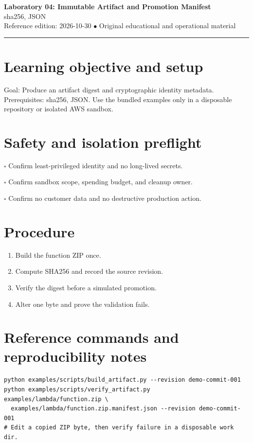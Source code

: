 \documentclass[10pt,letterpaper]{article}
\begin{document}
\begin{center}
{\LARGE\bfseries\color{cdblue}Laboratory 04: Immutable Artifact and Promotion Manifest}\\[7pt]
{\large sha256, JSON}\\[6pt]
{\small Reference edition: 2026-10-30 $\bullet$ Original educational and operational material}
\end{center}
\noindent\color{cdblue}\rule{\linewidth}{1.2pt}\color{black}
\vspace{0.4em}
\section{Learning objective and setup}
Goal: Produce an artifact digest and cryptographic identity metadata. Prerequisites: sha256, JSON. Use the bundled examples only in a disposable repository or isolated AWS sandbox.


\section{Safety and isolation preflight}
\noindent $\square$ Confirm least-privileged identity and no long-lived secrets.\par\vspace{0.35em}
\noindent $\square$ Confirm sandbox scope, spending budget, and cleanup owner.\par\vspace{0.35em}
\noindent $\square$ Confirm no customer data and no destructive production action.\par\vspace{0.35em}

\section{Procedure}
\begin{enumerate}
\item Build the function ZIP once.
\item Compute SHA256 and record the source revision.
\item Verify the digest before a simulated promotion.
\item Alter one byte and prove the validation fails.
\end{enumerate}

\section{Reference commands and reproducibility notes}
\begin{verbatim}
python examples/scripts/build_artifact.py --revision demo-commit-001
python examples/scripts/verify_artifact.py examples/lambda/function.zip \
  examples/lambda/function.zip.manifest.json --revision demo-commit-001
# Edit a copied ZIP byte, then verify failure in a disposable work dir.
\end{verbatim}
\end{document}
